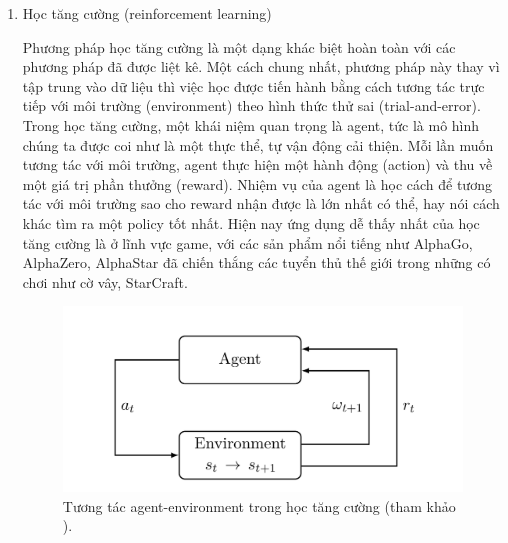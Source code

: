 \begin{enumerate}
    \item Học tăng cường (reinforcement learning)
    
    Phương pháp học tăng cường là một dạng khác biệt hoàn toàn với các phương pháp đã được liệt kê. Một cách chung nhất, phương pháp này thay vì tập trung vào dữ liệu thì việc học được tiến hành bằng cách tương tác trực tiếp với môi trường (environment) theo hình thức thử sai (trial-and-error). Trong học tăng cường, một khái niệm quan trọng là agent, tức là mô hình chúng ta được coi như là một thực thể, tự vận động cải thiện. Mỗi lần muốn tương tác với môi trường, agent thực hiện một hành động (action) và thu về một giá trị phần thưởng (reward). Nhiệm vụ của agent là học cách để tương tác với môi trường sao cho reward nhận được là lớn nhất có thể, hay nói cách khác tìm ra  một policy tốt nhất. Hiện nay ứng dụng dễ  thấy nhất của học tăng cường là ở lĩnh vực game, với các sản phẩm nổi tiếng như AlphaGo, AlphaZero, AlphaStar đã chiến thắng các tuyển thủ thế giới trong những có chơi như cờ vây, StarCraft.

    \begin{figure}[t]
        \begin{center}
            \includegraphics[width=\linewidth]{asset/image/rl.png}
            \caption{Tương tác agent-environment trong học tăng cường (tham khảo \cite{franccois2018introduction}). }
            \label{fig:semi2}
        \end{center}
    \end{figure}
\end{enumerate}


